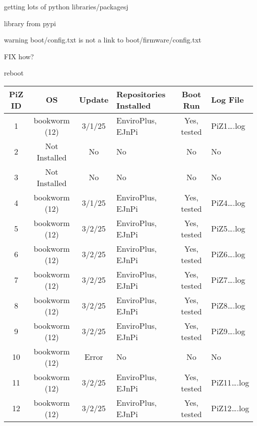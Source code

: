 \documentclass{article}
\begin{document}
getting lots of python libraries/packagesj

library from pypi

warning boot/config.txt is not a link to boot/firmware/config.txt

FIX how?

reboot

\begin{table}[h!]
\begin{center}
\begin{tabular}{|c|c|c|p{2.3cm}|c| l|}
\hline
\textbf{PiZ ID} & \textbf{OS} & \textbf{Update} & \textbf{Repositories Installed} & \textbf{Boot Run} & \textbf{Log File} \\
\hline
1  & bookworm (12)    & 3/1/25 & EnviroPlus, EJnPi & Yes, tested  & PiZ1\ldots.log\\
2  & Not Installed    & No & No  & No & No\\
3  & Not Installed    & No & No & No & No\\
4  & bookworm (12)    & 3/1/25 & EnviroPlus, EJnPi & Yes, tested & PiZ4\ldots.log \\

5  & bookworm (12)    & 3/2/25 & EnviroPlus, EJnPi & Yes, tested & PiZ5\ldots.log \\
6  & bookworm (12)    & 3/2/25 & EnviroPlus, EJnPi & Yes, tested & PiZ6\ldots.log \\
7  & bookworm (12)    & 3/2/25 & EnviroPlus, EJnPi & Yes, tested & PiZ7\ldots.log \\
8  & bookworm (12)    & 3/2/25 & EnviroPlus, EJnPi & Yes, tested & PiZ8\ldots.log \\

9  & bookworm (12)    & 3/2/25 & EnviroPlus, EJnPi & Yes, tested& PiZ9\ldots.log\\
10 & bookworm (12)    & Error & No & No & No \\
11 & bookworm (12)    & 3/2/25 & EnviroPlus, EJnPi & Yes, tested & PiZ11\ldots.log \\
12 & bookworm (12)    & 3/2/25 & EnviroPlus, EJnPi & Yes, tested & PiZ12\ldots.log \\


\end{tabular}
\end{center}
\end{table}
\end{document}
